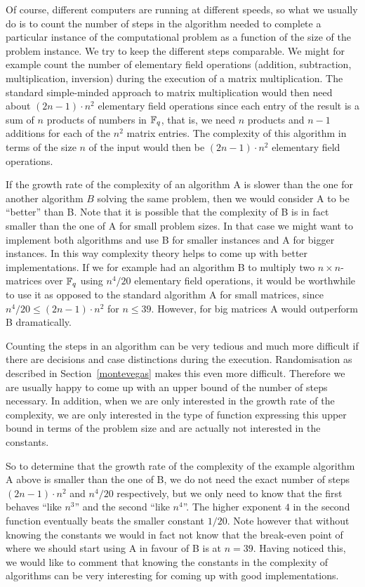 Of course, different computers are running at different speeds, so
what we usually do is to count the number of steps in the algorithm
needed to complete a particular instance of the computational problem
as a function of the size of the problem instance.
We try to keep the different steps comparable. We might for example
count the number of elementary field operations (addition,
subtraction, multiplication, inversion) during the execution of a
matrix multiplication. The standard simple-minded approach to matrix
multiplication would then need about $(2n-1)\cdot n^2$ elementary field
operations since each entry of the result is a sum of $n$ products of
numbers in $\mathbb{F}_q$, that is, we need $n$ products and $n-1$ additions
for each of the $n^2$ matrix entries. The complexity of this algorithm
in terms of the size $n$ of the input would then be $(2n-1)\cdot n^2$
elementary field operations.

If the growth rate of the complexity of an algorithm A is slower
than the one for another algorithm $B$ solving the same problem, then 
we would consider A to be ``better'' than B. Note that it is
possible that the complexity of B is in fact smaller than
the one of A for small problem sizes. In that case we might want to
implement both algorithms and use B for smaller instances and A for
bigger instances. In this way complexity theory helps to come up with
better implementations. If we for example had an algorithm B to multiply
two $n\times n$-matrices over $\mathbb{F}_q$ using $n^4/20$ elementary field
operations, it would be worthwhile to use it as opposed to the
standard algorithm A for small matrices, since
$n^4/20 \le (2n-1)\cdot n^2$ for $n \le 39$. However, for big
matrices A would outperform B dramatically.

Counting the steps in an algorithm can be very tedious and much more
difficult if there are decisions and case distinctions during the
execution. Randomisation as described in Section~\ref{montevegas}
makes this even more difficult. Therefore we are usually happy to come
up with an upper bound of the number of steps necessary. In addition,
when we are only interested in the growth rate of the complexity, we
are only interested in the type of function expressing this upper
bound in terms of the problem size and are actually not interested in
the constants. 

So to determine that the growth rate of the complexity
of the example algorithm A above is smaller than the one of B, we do
not need the exact number of steps $(2n-1)\cdot n^2$ and $n^4/20$
respectively, but we only need to know that the first behaves ``like
$n^3$'' and the second ``like $n^4$''. The higher exponent $4$ in the
second function eventually beats the smaller constant $1/20$.
Note however that without knowing the constants we would in fact not
know that the break-even point of where we should start using A in
favour of B is at $n=39$. Having noticed this, we would like to comment
that knowing the constants in the complexity of algorithms can be very
interesting for coming up with good implementations.


